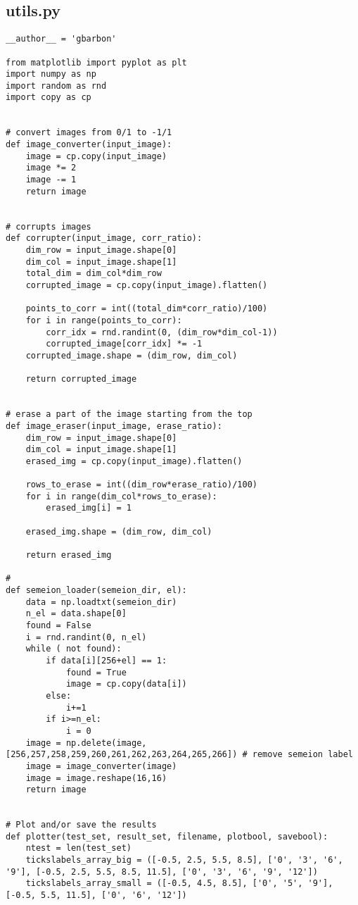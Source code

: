 \documentclass[letterpaper,twocolumn,10pt]{article}
\begin{document}
\subsection{utils.py}
\begin{lstlisting}
__author__ = 'gbarbon'

from matplotlib import pyplot as plt
import numpy as np
import random as rnd
import copy as cp


# convert images from 0/1 to -1/1
def image_converter(input_image):
    image = cp.copy(input_image)
    image *= 2
    image -= 1
    return image


# corrupts images
def corrupter(input_image, corr_ratio):
    dim_row = input_image.shape[0]
    dim_col = input_image.shape[1]
    total_dim = dim_col*dim_row
    corrupted_image = cp.copy(input_image).flatten()

    points_to_corr = int((total_dim*corr_ratio)/100)
    for i in range(points_to_corr):
        corr_idx = rnd.randint(0, (dim_row*dim_col-1))
        corrupted_image[corr_idx] *= -1
    corrupted_image.shape = (dim_row, dim_col)

    return corrupted_image


# erase a part of the image starting from the top
def image_eraser(input_image, erase_ratio):
    dim_row = input_image.shape[0]
    dim_col = input_image.shape[1]
    erased_img = cp.copy(input_image).flatten()

    rows_to_erase = int((dim_row*erase_ratio)/100)
    for i in range(dim_col*rows_to_erase):
        erased_img[i] = 1

    erased_img.shape = (dim_row, dim_col)

    return erased_img

#
def semeion_loader(semeion_dir, el):
    data = np.loadtxt(semeion_dir)
    n_el = data.shape[0]
    found = False
    i = rnd.randint(0, n_el)
    while ( not found):
        if data[i][256+el] == 1:
            found = True
            image = cp.copy(data[i])
        else:
            i+=1
        if i>=n_el:
            i = 0
    image = np.delete(image, [256,257,258,259,260,261,262,263,264,265,266]) # remove semeion label
    image = image_converter(image)
    image = image.reshape(16,16)
    return image


# Plot and/or save the results
def plotter(test_set, result_set, filename, plotbool, savebool):
    ntest = len(test_set)
    tickslabels_array_big = ([-0.5, 2.5, 5.5, 8.5], ['0', '3', '6', '9'], [-0.5, 2.5, 5.5, 8.5, 11.5], ['0', '3', '6', '9', '12'])
    tickslabels_array_small = ([-0.5, 4.5, 8.5], ['0', '5', '9'], [-0.5, 5.5, 11.5], ['0', '6', '12'])


\end{lstlisting}
\end{document}
